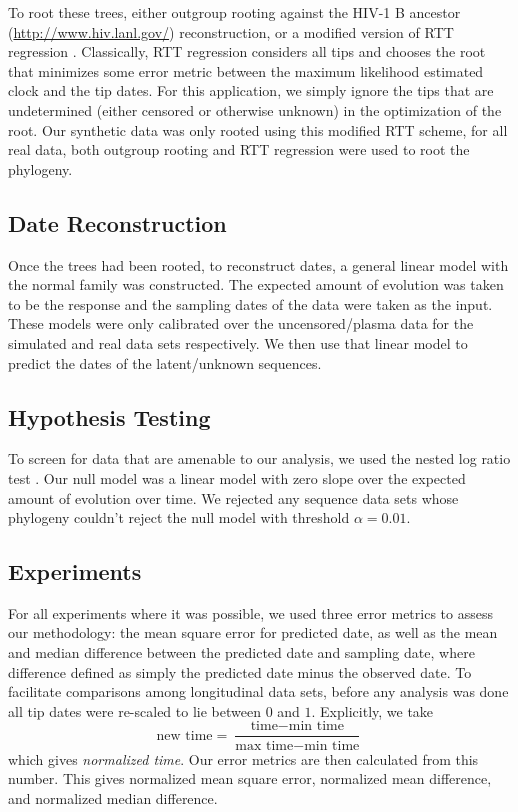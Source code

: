 To root these trees, either outgroup rooting against the HIV-1 B ancestor (\href{http://www.hiv.lanl.gov/}{http://www.hiv.lanl.gov/}) reconstruction, or a modified version of RTT regression \citep{APE}. 
Classically, RTT regression considers all tips and chooses the root that minimizes some error metric between the maximum likelihood estimated clock and the tip dates. 
For this application, we simply ignore the tips that are undetermined (either censored or otherwise unknown) in the optimization of the root. 
Our synthetic data was only rooted using this modified RTT scheme, for all real data, both outgroup rooting and RTT regression were used to root the phylogeny. 



\subsection{Date Reconstruction} \label{subsec:daterecon}
Once the trees had been rooted, to reconstruct dates, a general linear model with the normal family was constructed. 
The expected amount of evolution was taken to be the response and the sampling dates of the data were taken as the input. 
These models were only calibrated over the uncensored/plasma data for the simulated and real data sets respectively.
We then use that linear model to predict the dates of the latent/unknown sequences.


\subsection{Hypothesis Testing} \label{subsec:hypot}
To screen for data that are amenable to our analysis, we used the nested log ratio test \citep{Ho14}. 
Our null model was a linear model with zero slope over the expected amount of evolution over time. 
We rejected any sequence data sets whose phylogeny couldn't reject the null model with threshold $\alpha=0.01$.


\subsection{Experiments} \label{subsec:experiments}
For all experiments where it was possible, we used three error metrics to assess  our methodology: the mean square error for predicted date, as well as the mean and median difference between the predicted date and sampling date, where difference defined as simply the predicted date minus the observed date.
To facilitate comparisons among longitudinal data sets, before any analysis was done all tip dates were re-scaled to lie between $0$ and $1$. 
Explicitly, we take $$ \text{new time} = \frac{\text{time} - \text{min time}}{\text{max time} - \text{min time}}$$ which gives {\em normalized time}. Our error metrics are then calculated from this number. This gives normalized mean square error, normalized mean difference, and normalized median difference. 

